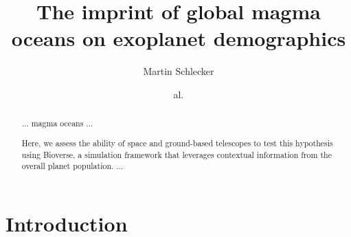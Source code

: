 \documentclass[modern]{aastex631}
\begin{document}
\title{The imprint of global magma oceans on exoplanet demographics}

\author[0000-0001-8355-2107]{Martin Schlecker}
\author{al.}


\begin{abstract}
    $\ldots$ magma oceans $\ldots$

    Here, we assess the ability of space and ground-based telescopes to test this hypothesis using Bioverse, a simulation framework that leverages contextual information from the overall planet population.
    $\ldots$

\end{abstract}

\section{Introduction}
\end{document}
